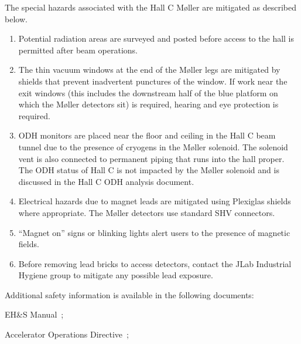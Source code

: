 {\begin{safetyen}{0}{0}

The special hazards associated with the Hall C M\o ller are mitigated as
described below.

\begin{enumerate}
        \item{Potential radiation areas are surveyed and posted before access to the hall is permitted
        after beam operations.}
        \item{The thin vacuum windows at the end of the M\o ller legs are mitigated by shields that prevent inadvertent
        punctures of the window. If work near the exit windows (this includes the downstream half of the blue platform
        on which the M\o ller detectors sit) is required, hearing and eye protection is required.}
        \item{ODH monitors are placed near the floor and ceiling in the Hall C beam tunnel due to the presence of cryogens
        in the M\o ller solenoid. The solenoid vent is also connected to permanent piping that runs into the hall proper.
        The ODH status of Hall C is not impacted by the M\o ller solenoid and is discussed in the Hall C ODH
        analysis document.}
        \item{Electrical hazards due to magnet leads are mitigated using Plexiglas shields where appropriate.
        The M\o ller detectors use standard SHV connectors.}
        \item{``Magnet on'' signs or blinking lights alert users to the presence of magnetic fields.}
        \item{Before removing lead bricks to access detectors, contact the JLab Industrial Hygiene group to mitigate any possible
        lead exposure.}
\end{enumerate}

\noindent{}Additional safety information is available in the following documents:
\begin{list}{--}{\setlength{\itemsep}{-0.15cm}}
  \item EH\&S Manual~\cite{EHScebaf};
  \item Accelerator Operations Directive~\cite{AODcebaf};
\end{list}


\end{safetyen}}
